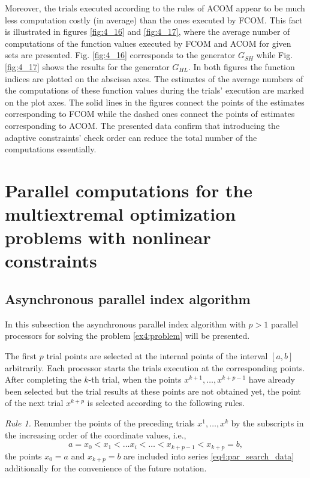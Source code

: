 Moreover, the trials executed according to the rules of ACOM appear to be much less computation costly (in average) than the ones executed by FCOM. This fact is illustrated in figures \ref{fig:4_16} and \ref{fig:4_17}, where the average number of computations of the function values executed by FCOM and ACOM for given sets are presented. Fig. \ref{fig:4_16} corresponds to the generator $G_{SH}$ while Fig. \ref{fig:4_17} shows the results for the generator $G_{HL}$. In both figures the function indices are plotted on the abscissa axes. The estimates of the average numbers of the computations of these function values during the trials’ execution are marked on the plot axes. The solid lines in the figures connect the points of the estimates corresponding to FCOM while the dashed ones connect the points of estimates corresponding to ACOM. The presented data confirm that introducing the adaptive constraints’ check order can reduce the total number of the computations essentially.

\section{Parallel computations for the multiextremal optimization problems with nonlinear constraints}
\subsection{Asynchronous parallel index algorithm}
In this subsection the asynchronous parallel index algorithm with $p>1$ parallel processors for solving the problem \eqref{ex4:problem} will be presented.

The first $p$ trial points are selected at the internal points of the interval $[a,b]$ arbitrarily. Each processor starts the trials execution at the corresponding points. After completing the $k$-th trial, when the points $x^{k+1},\dots, x^{k+p - 1}$ have already been selected but the trial results at these points are not obtained yet, the point of the next trial $x^{k+p}$ is selected according to the following rules.

\emph{Rule 1.} Renumber the points of the preceding trials $x^1,\dots,x^k$ by the subscripts in the increasing order of the coordinate values, i.e.,
\begin{equation}
  \label{eq4:par_search_data}
  a=x_0<x_1<\dots x_i<\dots<x_{k+p-1}<x_{k+p}=b,
\end{equation}
the points $x_0=a$ and $x_{k + p}=b$ are included into series \eqref{eq4:par_search_data} additionally for the convenience of the future notation.

